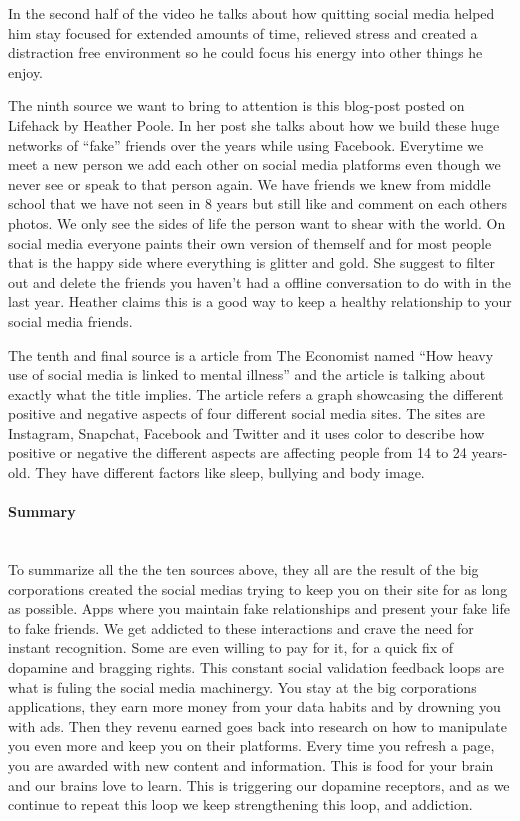 \documentclass[11pt]{article}
\begin{document}
In the second half of the video he talks about how quitting social media helped him stay
focused for extended amounts of time, relieved stress and created a distraction free
environment so he could focus his energy into other things he enjoy.

The ninth source \cite{lifehack} we want to bring to attention is this blog-post posted
on Lifehack by Heather Poole. In her post she talks about how we build these huge
networks of “fake” friends over the years while using Facebook. Everytime we meet a new
person we add each other on social media platforms even though we never see or speak to
that person again. We have friends we knew from middle school that we have not seen in
8 years but still like and comment on each others photos. We only see the sides of life
the person want to shear with the world. On social media everyone paints their own
version of themself and for most people that is the happy side where everything is
glitter and gold. She suggest to filter out and delete the friends you haven’t had a
offline conversation to do with in the last year. Heather claims this is a good way to
keep a healthy relationship to your social media friends.

The tenth and final source \cite{economist} is a article from The Economist named “How
heavy use of social media is linked to mental illness” and the article is talking about
exactly what the title implies. The article refers a graph showcasing the different
positive and negative aspects of four different social media sites. The sites are
Instagram, Snapchat, Facebook and Twitter and it uses color to describe how positive
or negative the different aspects are affecting people from 14 to 24 years-old. They
have different factors like sleep, bullying and body image.

\paragraph{Summary} \hspace{0pt} \\
To summarize all the the ten sources above, they all are the result of the big
corporations created the social medias trying to keep you on their site for as long as
possible. Apps where you maintain fake relationships and present your fake life to fake
friends.  We get addicted to these interactions and crave the need for instant
recognition. Some are even willing to pay for it, for a quick fix of dopamine and
bragging rights. This constant social validation feedback loops are what is fuling the
social media machinergy. You stay at the big corporations applications, they earn more
money from your data habits and by drowning you with ads. Then they revenu earned goes
back into research on how to manipulate you even more and keep you on their platforms.
Every time you refresh a page, you are awarded with new content and information. This
is food for your brain and our brains love to learn. This is triggering our dopamine
receptors, and as we continue to repeat this loop we keep strengthening this loop, and
addiction.
\end{document}
